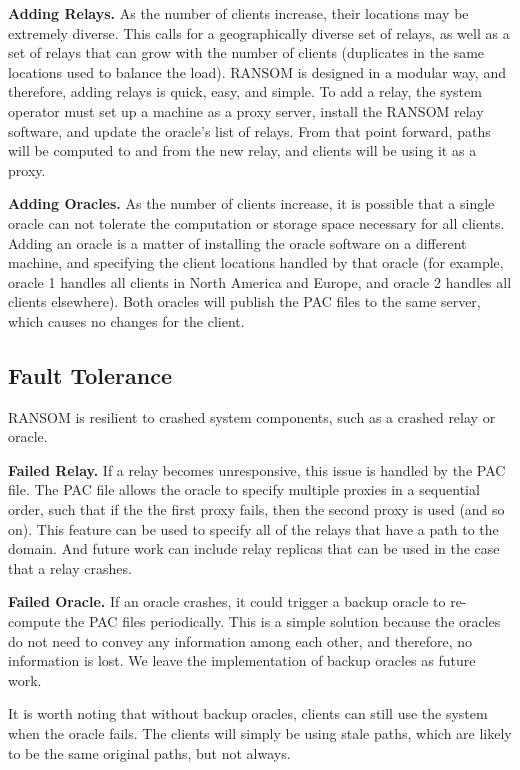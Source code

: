 {\bf Adding Relays.} As the number of clients increase, their locations may be 
extremely diverse. This calls for a geographically diverse set of relays, as 
well as a set of relays that can grow with the number of clients (duplicates in 
the same locations used to balance the load).  RANSOM is 
designed in a modular way, and therefore, adding relays is quick, easy, and 
simple.  To add a relay, the system operator must set up a machine as a proxy 
server, install the RANSOM relay software, and update the oracle's list of 
relays.  From that point forward, paths will be computed to and from the new 
relay, and clients will be using it as a proxy.  

{\bf Adding Oracles.} As the number of clients increase, it is possible that a 
single oracle can not tolerate the computation or storage space necessary for 
all clients.  Adding an oracle is a matter of installing the oracle software on 
a different machine, and specifying the client locations handled by that oracle 
(for example, oracle 1 handles all clients in North America and Europe, and 
oracle 2 handles all clients elsewhere).  Both oracles will publish the PAC files 
to the same server, which causes no changes for the client.

\subsection{Fault Tolerance}
RANSOM is resilient to crashed system components, such as a crashed relay or 
oracle.  

{\bf Failed Relay.} If a relay becomes unresponsive, this issue is handled by 
the PAC file.  The PAC file allows the oracle to specify multiple proxies in 
a sequential order, such that if the the first proxy fails, then the second 
proxy is used (and so on).  This feature can be used to specify all of the 
relays that have a path to the domain.  And future work can include relay 
replicas that can be used in the case that a relay crashes.

{\bf Failed Oracle.} If an oracle crashes, it could trigger a backup oracle 
to re-compute the PAC files periodically.  This is a simple solution because 
the oracles do not need to convey any information among each other, and therefore, 
no information is lost.  We leave the implementation of backup oracles as future 
work.

It is worth noting that without backup oracles, clients can still use the system 
when the oracle fails.  The clients will simply be using stale paths, which are 
likely to be the same original paths, but not always.  

